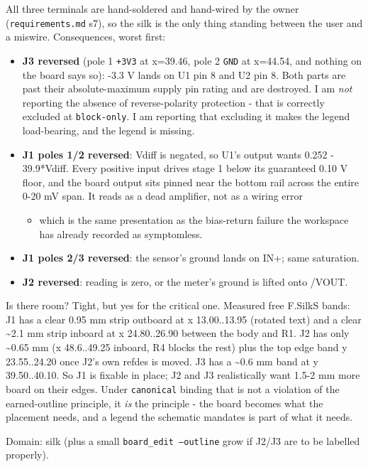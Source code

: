 \documentclass[11pt,a4paper]{article}
\begin{document}
All three terminals are hand-soldered and hand-wired by the owner (\texttt{requirements.md} s7), so the silk is the only thing standing between the user and a miswire. Consequences, worst first:

\begin{itemize}
\item \textbf{J3 reversed} (pole 1 \texttt{+3V3} at x=39.46, pole 2 \texttt{GND} at x=44.54, and
nothing on the board says so): -3.3 V lands on U1 pin 8 and U2 pin 8. Both
parts are past their absolute-maximum supply pin rating and are destroyed.
I am \emph{not} reporting the absence of reverse-polarity protection - that is
correctly excluded at \texttt{block-only}. I am reporting that excluding it makes
the legend load-bearing, and the legend is missing.
\item \textbf{J1 poles 1/2 reversed}: Vdiff is negated, so U1's output wants
0.252 - 39.9{*}Vdiff. Every positive input drives stage 1 below its guaranteed
0.10 V floor, and the board output sits pinned near the bottom rail across
the entire 0-20 mV span. It reads as a dead amplifier, not as a wiring error
\begin{itemize}
\item which is the same presentation as the bias-return failure the workspace has
already recorded as symptomless.
\end{itemize}
\item \textbf{J1 poles 2/3 reversed}: the sensor's ground lands on IN+; same saturation.
\item \textbf{J2 reversed}: reading is zero, or the meter's ground is lifted onto /VOUT.
\end{itemize}
Is there room? Tight, but yes for the critical one. Measured free F.SilkS bands: J1 has a clear 0.95 mm strip outboard at x 13.00..13.95 (rotated text) and a clear \textasciitilde{}2.1 mm strip inboard at x 24.80..26.90 between the body and R1. J2 has only \textasciitilde{}0.65 mm (x 48.6..49.25 inboard, R4 blocks the rest) plus the top edge band y 23.55..24.20 once J2's own refdes is moved. J3 has a \textasciitilde{}0.6 mm band at y 39.50..40.10. So J1 is fixable in place; J2 and J3 realistically want 1.5-2 mm more board on their edges. Under \texttt{canonical} binding that is not a violation of the earned-outline principle, it \emph{is} the principle - the board becomes what the placement needs, and a legend the schematic mandates is part of what it needs.

Domain: silk (plus a small \texttt{board\_edit --outline} grow if J2/J3 are to be labelled properly).
\end{document}
